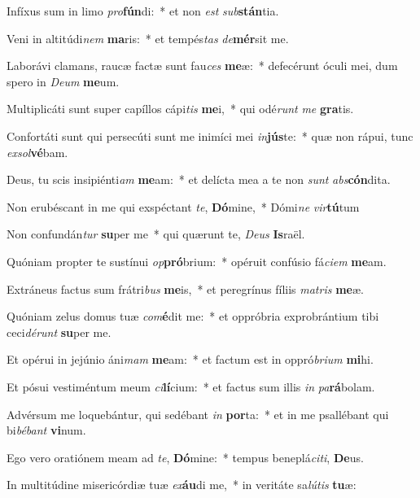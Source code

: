 \item Infíxus sum in limo \textit{pro}\textbf{fún}di:~* et non \textit{est} \textit{sub}\textbf{stán}tia.
\item Veni in altitúdi\textit{nem} \textbf{ma}ris:~* et tempés\textit{tas} \textit{de}\textbf{mér}sit me.
\item Laborávi clamans, raucæ factæ sunt fau\textit{ces} \textbf{me}æ:~* defecérunt óculi mei, dum spero in \textit{De}\textit{um} \textbf{me}um.
\item Multiplicáti sunt super capíllos cápi\textit{tis} \textbf{me}i,~* qui odé\textit{runt} \textit{me} \textbf{gra}tis.
\item Confortáti sunt qui persecúti sunt me inimíci mei \textit{in}\textbf{jús}te:~* quæ non rápui, tunc \textit{ex}\textit{sol}\textbf{vé}bam.
\item Deus, tu scis insipiénti\textit{am} \textbf{me}am:~* et delícta mea a te non \textit{sunt} \textit{abs}\textbf{cón}dita.
\item Non erubéscant in me qui exspéctant \textit{te}, \textbf{Dó}mine,~* Dómi\textit{ne} \textit{vir}\textbf{tú}tum
\item Non confundán\textit{tur} \textbf{su}per me~* qui quærunt te, \textit{De}\textit{us} \textbf{Is}raël.
\item Quóniam propter te sustínui \textit{op}\textbf{pró}brium:~* opéruit confúsio fá\textit{ci}\textit{em} \textbf{me}am.
\item Extráneus factus sum frátri\textit{bus} \textbf{me}is,~* et peregrínus fíliis \textit{ma}\textit{tris} \textbf{me}æ.
\item Quóniam zelus domus tuæ \textit{com}\textbf{é}dit me:~* et oppróbria exprobrántium tibi ceci\textit{dé}\textit{runt} \textbf{su}per me.
\item Et opérui in jejúnio áni\textit{mam} \textbf{me}am:~* et factum est in oppró\textit{bri}\textit{um} \textbf{mi}hi.
\item Et pósui vestiméntum meum \textit{ci}\textbf{lí}cium:~* et factus sum illis \textit{in} \textit{pa}\textbf{rá}bolam.
\item Advérsum me loquebántur, qui sedébant \textit{in} \textbf{por}ta:~* et in me psallébant qui bi\textit{bé}\textit{bant} \textbf{vi}num.
\item Ego vero oratiónem meam ad \textit{te}, \textbf{Dó}mine:~* tempus beneplá\textit{ci}\textit{ti}, \textbf{De}us.
\item In multitúdine misericórdiæ tuæ \textit{ex}\textbf{áu}di me,~* in veritáte sa\textit{lú}\textit{tis} \textbf{tu}æ:
